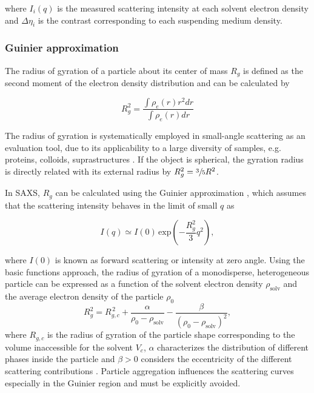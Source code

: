 where $I_i (q)$ is the measured scattering intensity at each solvent electron density and $\Delta \eta _i$ is the contrast corresponding to each suspending medium density.

\subsubsection{Guinier approximation}
\label{sec:TheoryGuinier}

The radius of gyration of a particle about its center of mass $R_g$ is defined as the second moment of the electron density distribution and can be calculated by 

\begin{equation}
        R_g^2 = \frac{\int \rho_e (r) r^2 dr}{\int \rho_e (r)  dr}
\end{equation}

The radius of gyration is systematically employed in small-angle scattering as an evaluation tool, due to its applicability to a large diversity of samples, e.g. proteins, colloids, suprastructures \citep{mertens_structural_2010,sim_salt_2012}. If the object is spherical, the gyration radius is directly related with its external radius by $R_g^2 = \sfrac{3}{5}R^2$.

In SAXS, $R_g$ can be calculated using the Guinier approximation \citep{guinier_diffraction_1939,guinier_small-angle_1955}, which assumes that the scattering intensity behaves in the limit of small \(q\) as

\begin{equation}
\label{eq:guinier}
I(q) \simeq I(0)\,\mbox{exp}\left(-\frac{R_g^2}{3}q^2\right),
\end{equation}

where \( I(0)\) is known as forward scattering or intensity at zero angle. Using the basic functions approach, the radius of gyration of a monodisperse, heterogeneous particle can be expressed as a function of the solvent electron density \( \rho_{\text{solv}} \) and the average electron density of the particle \( \rho_0 \) \citep{feigin_structure_1987}
\begin{equation}
R_g^2=R_{g,c}^{\,2}+\frac{\alpha}{\rho_0-\rho_{\text{solv}}}-\frac{\beta}{(\rho_0-\rho_{\text{solv}})^2},
\label{eq:gyration}
\end{equation}
where \(R_{g,c}\) is the radius of gyration of the particle shape corresponding to the volume inaccessible for the solvent \( V_c \), \( \alpha \) characterizes the distribution of different phases inside the particle and \( \beta>0 \) considers the eccentricity of the different scattering contributions \citep{stuhrmann_small-angle_2008}. Particle aggregation influences the scattering curves especially in the Guinier region and must be explicitly avoided.

